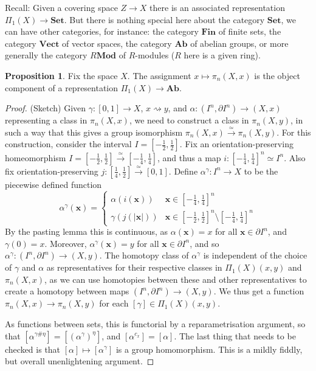 \documentclass{tufte-handout}
\def\Set {\mathbf{Set}}
\def\Mod {\mathbf{Mod}}
\def\Ab {\mathbf{Ab}}
\def\Fin {\mathbf{Fin}}
\def\Vect {\mathbf{Vect}}
\theoremstyle{definition}
\newtheorem{prop}{Proposition}
\newtheorem{example}{Example}
\begin{document}
Recall: Given a covering space $Z\to X$ there is an associated representation $\Pi_1(X) \to \Set$. But there is nothing special here about the category $\Set$, we can have other categories, for instance: the category $\Fin$ of finite sets, the category $\Vect$ of vector spaces, the category $\Ab$ of abelian groups, or more generally the category $R\Mod$ of $R$-modules ($R$ here is a given ring).


\begin{prop}
Fix the space $X$. The assignment $x\mapsto \pi_n(X,x)$ is the object component of a representation $\Pi_1(X) \to \Ab$.
\end{prop}

\begin{proof}
(Sketch) Given $\gamma\colon [0,1] \to X$, $x\rightsquigarrow y$, and $\alpha\colon (I^n,\partial I^n) \to (X,x)$ representing a class in $\pi_n(X,x)$, we need to construct a class in $\pi_n(X,y)$, in such a way that this gives a group isomorphism $\pi_n(X,x) \xrightarrow{\simeq} \pi_n(X,y)$. For this construction, consider the interval $I = [-\frac12,\frac12]$.
Fix an orientation-preserving homeomorphism $I = [-\frac12,\frac12]\xrightarrow{\simeq} [-\frac14,\frac14]$, and thus a map $i\colon [-\frac14,\frac14]^n  \simeq I^n $. Also fix orientation-preserving $j\colon [\frac14,\frac12]\xrightarrow{\simeq} [0,1]$.  Define $\alpha^\gamma\colon I^n \to X$ to be the piecewise defined function
\[
\alpha^\gamma(\mathbf{x}) = \begin{cases} 
\alpha(i(\mathbf{x})) & \mathbf{x} \in [-\frac14,\frac14]^n\\
\gamma(j(|\mathbf{x}|)) & \mathbf{x} \in [-\frac12,\frac12]^n \setminus [-\frac14,\frac14]^n
\end{cases}
\]
By the pasting lemma this is continuous, as $\alpha(\mathbf{x}) = x$ for all $\mathbf{x} \in \partial I^n$, and $\gamma(0) = x$. Moreover, $\alpha^\gamma(\mathbf{x}) = y$ for all $\mathbf{x} \in \partial I^n$, and so $\alpha^\gamma\colon (I^n,\partial I^n) \to (X,y)$. The homotopy class of $\alpha^\gamma$ is independent of the choice of $\gamma$ and $\alpha$ as representatives for their respective classes in $\Pi_1(X)(x,y)$ and $\pi_n(X,x)$, as we can use homotopies between these and other representatives to create a homotopy between maps $(I^n,\partial I^n) \to (X,y)$. We thus get a function $\pi_n(X,x) \to \pi_n(X,y)$ for each $[\gamma]\in \Pi_1(X)(x,y)$.

As functions between sets, this is functorial by a reparametrisation argument, so that $[\alpha^{\gamma\#\eta}] = [(\alpha^\gamma)^\eta]$, and $[\alpha^{c_x}] = [\alpha]$. The last thing that needs to be checked is that $[\alpha]\mapsto [\alpha^\gamma]$ is a group homomorphism. This is a mildly fiddly, but overall unenlightening argument.
\end{proof}
\end{document}

